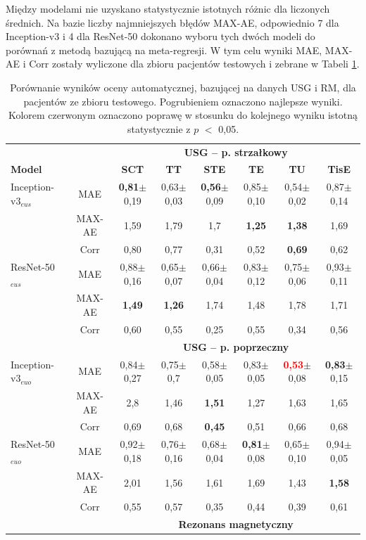 Między modelami nie uzyskano statystycznie istotnych różnic  dla liczonych średnich. Na bazie liczby najmniejszych błędów MAX-AE, odpowiednio 7 dla Inception-v3 i 4 dla ResNet-50 dokonano wyboru tych dwóch modeli do porównań z metodą bazującą na meta-regresji. W tym celu wyniki MAE, MAX-AE i Corr zostały wyliczone dla zbioru pacjentów testowych i zebrane w Tabeli \ref{tab:USGvsRM-cross-validation}.
\vspace{10px}
\renewcommand{\arraystretch}{1.2}
\begin{table}[h]
	\scriptsize
	\setlength{\tabcolsep}{1pt}
	\centering
	\caption{Porównanie wyników oceny automatycznej, bazującej na danych USG i RM, dla pacjentów ze zbioru testowego. Pogrubieniem oznaczono najlepsze wyniki. Kolorem czerwonym oznaczono poprawę w stosunku do kolejnego wyniku istotną statystycznie z $p$ $<$ 0,05.}
	\label{tab:USGvsRM-cross-validation}
	\vspace{-0.5cm}
	\begin{tabular}{lc||c|c|c|c|c|c}
		& & \multicolumn{6}{c}{\textbf{USG -- p. strzałkowy}} \\
		\textbf{Model} & & \textbf{SCT} & \textbf{TT} & \textbf{STE} & \textbf{TE} & \textbf{TU} & \textbf{TisE} \\ \hline \hline
		Inception-v3$_{eus}$ & MAE & \textbf{0,81}$\pm$0,19 & 0,63$\pm$0,03 & \textbf{0,56}$\pm$0,09 & 0,85$\pm$0,10 & 0,54$\pm$0,02 & 0,87$\pm$0,14 \\
		& MAX-AE & 1,59 & 1,79 & 1,7 & \textbf{1,25} & \textbf{1,38} & 1,69 \\
		& Corr & 0,80 & 0,77 & 0,31 & 0,52 & \textbf{0,69} & 0,62 \\ \hline
		ResNet-50$_{eus}$ & MAE & 0,88$\pm$0,16 & 0,65$\pm$0,07 & 0,66$\pm$0,04 & 0,83$\pm$0,12 & 0,75$\pm$0,06 & 0,93$\pm$0,11 \\
		& MAX-AE & \textbf{1,49} & \textbf{1,26} & 1,74 & 1,48 & 1,78 & 1,71 \\
		& Corr & 0,60 & 0,55 & 0,25 & 0,55 & 0,34 & 0,56 \\
		\hline \hline
		& & \multicolumn{6}{c}{\textbf{USG -- p. poprzeczny}} \\
		
		Inception-v3$_{euo}$ & MAE & 0,84$\pm$0,27 & 0,75$\pm$0,7 & 0,58$\pm$0,05 & 0,83$\pm$0,05 & \textcolor{red}{\textbf{0,53}}$\pm$0,08 & \textbf{0,83}$\pm$0,15 \\
		& MAX-AE & 2,8 & 1,46 & \textbf{1,51} & 1,27 & 1,63 & 1,65 \\
		& Corr & 0,69 & 0,68 & \textbf{0,45} & 0,51 & 0,66 & 0,68 \\ \hline
		ResNet-50$_{euo}$ & MAE & 0,92$\pm$0,18 & 0,76$\pm$0,16 & 0,68$\pm$0,04 & \textbf{0,81}$\pm$0,08 & 0,65$\pm$0,10 & 0,94$\pm$0,05 \\
		& MAX-AE & 2,01 & 1,56 & 1,61 & 1,69& 1,43 & \textbf{1,58}\\
		& Corr & 0,55 & 0,57 & 0,35 & 0,44 & 0,39 & 0,61 \\ \hline \hline
		& & \multicolumn{6}{c}{\textbf{Rezonans magnetyczny}} \\
		

\end{tabular}
\end{table}
